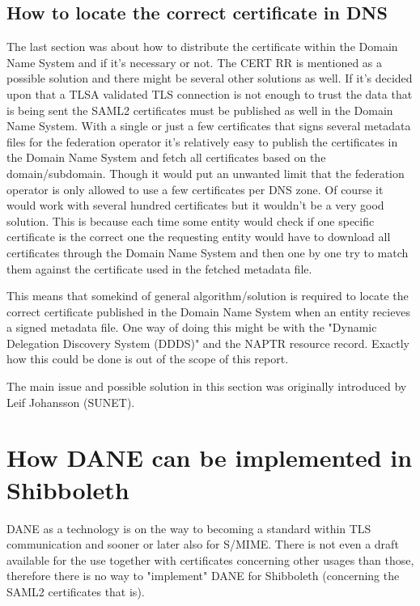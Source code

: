 \subsection{How to locate the correct certificate in DNS}
\label{subsec:matching-dilemma}
The last section was about how to distribute the certificate within the Domain Name System and if it's necessary or not.
The CERT RR is mentioned as a possible solution and there might be several other solutions as well.
If it's decided upon that a TLSA validated TLS connection is not enough to trust the data that is being sent the SAML2 certificates must be published as well in the Domain Name System.
With a single or just a few certificates that signs several metadata files for the federation operator it's relatively easy to publish the certificates in the Domain Name System and fetch all certificates based on the domain/subdomain.
Though it would put an unwanted limit that the federation operator is only allowed to use a few certificates per DNS zone.
Of course it would work with several hundred certificates but it wouldn't be a very good solution.
This is because each time some entity would check if one specific certificate is the correct one the requesting entity would have to download all certificates through the Domain Name System and then one by one try to match them against the certificate used in the fetched metadata file.

This means that somekind of general algorithm/solution is required to locate the correct certificate published in the Domain Name System when an entity recieves a signed metadata file.
One way of doing this might be with the "Dynamic Delegation Discovery System (DDDS)"\cite{rfc:3401,rfc:3402,rfc:3403,rfc:3404} and the NAPTR resource record\cite{rfc:3403}.
Exactly how this could be done is out of the scope of this report.

The main issue and possible solution in this section was originally introduced by Leif Johansson (SUNET).

\section{How DANE can be implemented in Shibboleth} 
DANE as a technology is on the way to becoming a standard within TLS communication and sooner or later also for S/MIME.
There is not even a draft available for the use together with certificates concerning other usages than those, therefore there is no way to "implement" DANE for Shibboleth (concerning the SAML2 certificates that is).

